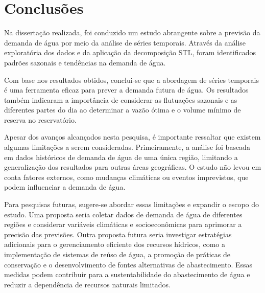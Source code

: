 \section{Conclus\~oes} \label{sec:conclusoes}

Na dissertação realizada, foi conduzido um estudo abrangente sobre a previsão da demanda de água por meio da análise de séries temporais. Através da análise exploratória dos dados e da aplicação da decomposição STL, foram identificados padrões sazonais e tendências na demanda de água.

Com base nos resultados obtidos, conclui-se que a abordagem de séries temporais é uma ferramenta eficaz para prever a demanda futura de água. Os resultados também indicaram a importância de considerar as flutuações sazonais e as diferentes partes do dia ao determinar a vazão ótima e o volume mínimo de reserva no reservatório.

Apesar dos avanços alcançados nesta pesquisa, é importante ressaltar que existem algumas limitações a serem consideradas. Primeiramente, a análise foi baseada em dados históricos de demanda de água de uma única região, limitando a generalização dos resultados para outras áreas geográficas. O estudo não levou em conta fatores externos, como mudanças climáticas ou eventos imprevistos, que podem influenciar a demanda de água.

Para pesquisas futuras, sugere-se abordar essas limitações e expandir o escopo do estudo. Uma proposta seria coletar dados de demanda de água de diferentes regiões e considerar variáveis climáticas e socioeconômicas para aprimorar a precisão das previsões. 
Outra proposta futura seria investigar estratégias adicionais para o gerenciamento eficiente dos recursos hídricos, como a implementação de sistemas de reúso de água, a promoção de práticas de conservação e o desenvolvimento de fontes alternativas de abastecimento. Essas medidas podem contribuir para a sustentabilidade do abastecimento de água e reduzir a dependência de recursos naturais limitados.



